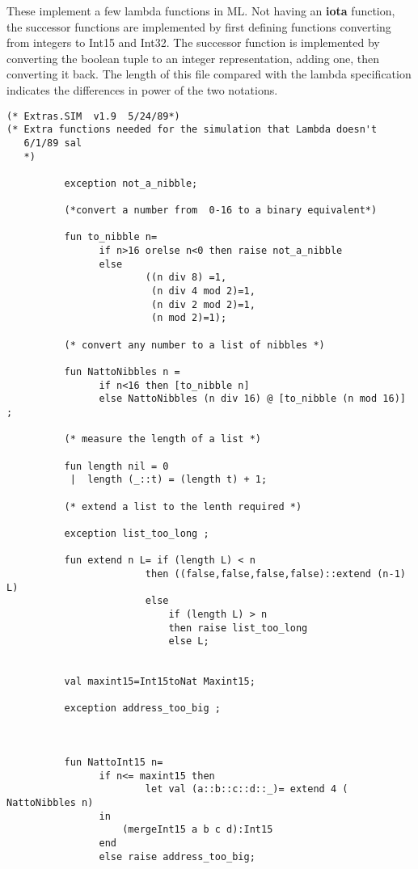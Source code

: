 These implement a few lambda functions in ML. 
Not having an {\bf iota} function, the successor functions are implemented by first defining functions converting from integers to Int15 and Int32.
The successor function is implemented by converting the boolean tuple to an integer representation, adding one, then converting it back.
The length of this file compared with the lambda specification indicates the differences in power of the two notations.

\begin{verbatim}
(* Extras.SIM  v1.9  5/24/89*) 
(* Extra functions needed for the simulation that Lambda doesn't 
   6/1/89 sal
   *)
           
          exception not_a_nibble; 

          (*convert a number from  0-16 to a binary equivalent*)

          fun to_nibble n= 
                if n>16 orelse n<0 then raise not_a_nibble
                else 
                        ((n div 8) =1, 
                         (n div 4 mod 2)=1, 
                         (n div 2 mod 2)=1, 
                         (n mod 2)=1); 

          (* convert any number to a list of nibbles *)

          fun NattoNibbles n = 
                if n<16 then [to_nibble n]  
                else NattoNibbles (n div 16) @ [to_nibble (n mod 16)] ;

          (* measure the length of a list *) 

          fun length nil = 0 
           |  length (_::t) = (length t) + 1; 

          (* extend a list to the lenth required *)

          exception list_too_long ;
           
          fun extend n L= if (length L) < n 
                        then ((false,false,false,false)::extend (n-1) L) 
                        else 
                        	if (length L) > n 
                        	then raise list_too_long
                        	else L; 

           
          val maxint15=Int15toNat Maxint15; 
           
          exception address_too_big ;  
           
		

          fun NattoInt15 n= 
                if n<= maxint15 then 
                        let val (a::b::c::d::_)= extend 4 ( NattoNibbles n) 
				in 
					(mergeInt15 a b c d):Int15
				end
                else raise address_too_big; 


\end{verbatim}

